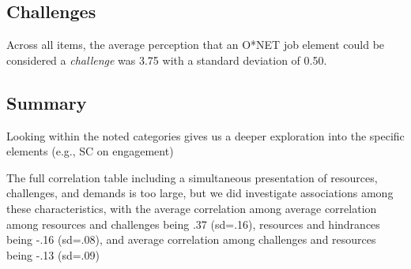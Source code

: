 \documentclass[
  english,
  man]{apa6}
\begin{document}
\hypertarget{challenges}{%
\subsection{Challenges}\label{challenges}}

Across all items, the average perception that an O*NET job element could be considered a \emph{challenge} was 3.75 with a standard deviation of 0.50.

\hypertarget{summary}{%
\subsection{Summary}\label{summary}}

Looking within the noted categories gives us a deeper exploration into the specific elements (e.g., SC on engagement)

The full correlation table including a simultaneous presentation of resources, challenges, and demands is too large, but we did investigate associations among these characteristics, with the average correlation among average correlation among resources and challenges being .37 (sd=.16), resources and hindrances being -.16 (sd=.08), and average correlation among challenges and resources being -.13 (sd=.09)
\end{document}
